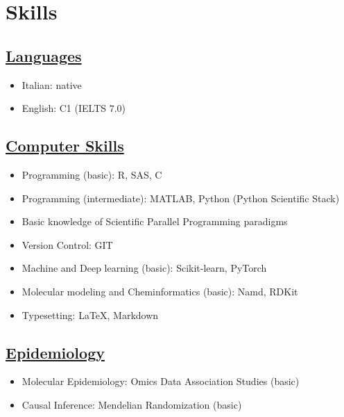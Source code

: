 \section{Skills}

\subsection{\underline{Languages}}
\begin{itemize}
  \item Italian: native
  \item English: C1 (IELTS $7.0$)
\end{itemize}


\subsection{\underline{Computer Skills}}
\begin{itemize}
  \item Programming (basic): R, SAS, C
  \item Programming (intermediate): MATLAB, Python (Python Scientific Stack)
  \item Basic knowledge of Scientific Parallel Programming paradigms
  \item Version Control: GIT
  \item Machine and Deep learning (basic): Scikit-learn, PyTorch
  \item Molecular modeling and Cheminformatics (basic): Namd, RDKit
  \item Typesetting: \LaTeX, Markdown
\end{itemize}


\subsection{\underline{Epidemiology}}
\begin{itemize}
	\item Molecular Epidemiology: Omics Data Association Studies (basic)
	\item Causal Inference: Mendelian Randomization (basic)
\end{itemize}
